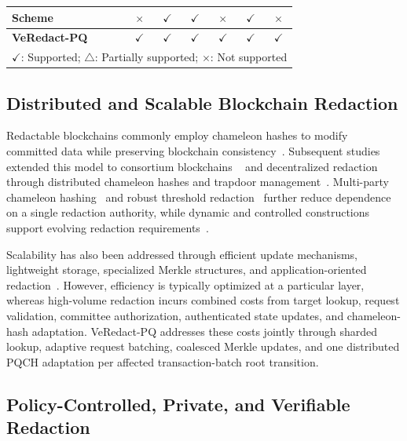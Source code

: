 \documentclass[lettersize,journal]{IEEEtran}
\begin{document}
\begin{table}[t]
\begin{tabular}{lcccccc}
    Scheme~\cite{ref34}
    & $\times$ & $\checkmark$ & $\checkmark$ & $\times$
    & $\checkmark$ & $\times$ \\
    
    \hline
    \textbf{VeRedact-PQ}
    & $\checkmark$ & $\checkmark$ & $\checkmark$
    & $\checkmark$ & $\checkmark$ & $\checkmark$ \\
    \hline
    
    \multicolumn{7}{l}{
    \footnotesize $\checkmark$: Supported;
    $\triangle$: Partially supported;
    $\times$: Not supported}
    \end{tabular}
    \end{table}
    \subsection{Distributed and Scalable Blockchain Redaction}
    
    Redactable blockchains commonly employ chameleon hashes to modify
    committed data while preserving blockchain consistency~\cite{ref9}.
    Subsequent studies extended this model to consortium blockchains
    ~\cite{ref2} and decentralized redaction through distributed chameleon
    hashes and trapdoor management~\cite{ref1,ref3,ref6,ref19,ref30}.
    Multi-party chameleon hashing~\cite{ref12} and robust threshold
    redaction~\cite{ref27} further reduce dependence on a single redaction
    authority, while dynamic and controlled constructions support evolving
    redaction requirements~\cite{ref5,ref16,ref36}.
    
    Scalability has also been addressed through efficient update
    mechanisms, lightweight storage, specialized Merkle structures, and
    application-oriented redaction~\cite{ref14,ref20,ref21,ref23,ref26}.
    However, efficiency is typically optimized at a particular layer,
    whereas high-volume redaction incurs combined costs from target lookup,
    request validation, committee authorization, authenticated state
    updates, and chameleon-hash adaptation. VeRedact-PQ addresses these
    costs jointly through sharded lookup, adaptive request batching,
    coalesced Merkle updates, and one distributed PQCH adaptation per
    affected transaction-batch root transition.
    
    \subsection{Policy-Controlled, Private, and Verifiable Redaction}
    
\end{document}
